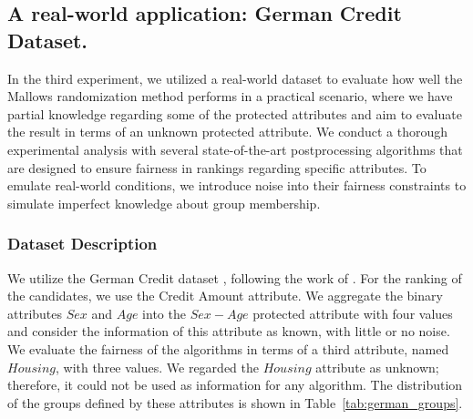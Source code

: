 \subsection{A real-world application: German Credit Dataset.}\label{exp:exp3}

In the third experiment, we utilized a real-world dataset to evaluate how well the Mallows randomization method performs in a practical scenario, where we have partial knowledge regarding some of the protected attributes and aim to evaluate the result in terms of an unknown protected attribute. We conduct a thorough experimental analysis with several state-of-the-art postprocessing algorithms that are designed to ensure fairness in rankings regarding specific attributes. To emulate real-world conditions, we introduce noise into their fairness constraints to simulate imperfect knowledge about group membership.

\subsubsection{Dataset Description}
We utilize the German Credit dataset \cite{germancredit}, following the work of \cite{yang2016measuring,RAPF}. For the ranking of the candidates, we use the Credit Amount attribute. 
We aggregate the binary attributes $Sex$ and $Age$ into the $Sex-Age$  protected attribute with four values and consider the information of this attribute as known, with little or no noise. We evaluate the fairness of the algorithms in terms of a third attribute, named $Housing$, with three values. We regarded the $Housing$ attribute as unknown; therefore, it could not be used as information for any algorithm.  The distribution of the groups defined by these attributes is shown in Table~\ref{tab:german_groups}.

